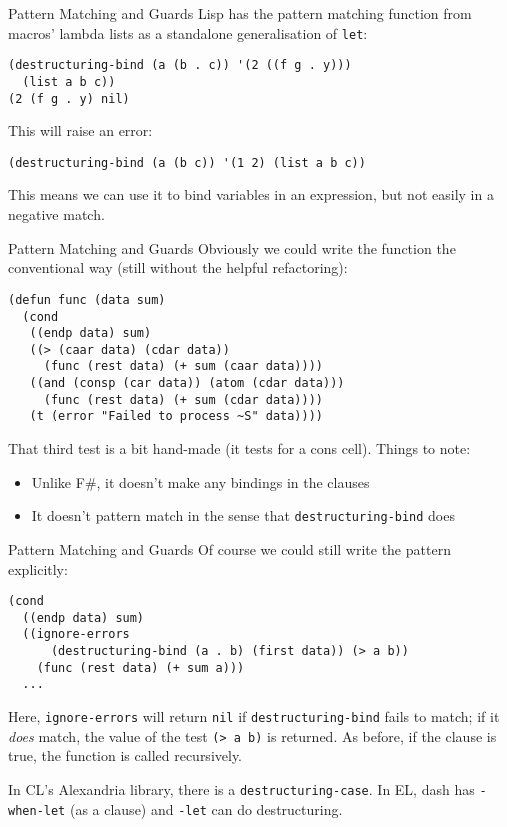 \documentclass[presentation]{beamer}
\begin{document}
\begin{frame}[fragile]{Pattern Matching and Guards}
Lisp has the pattern matching function from macros' lambda lists as a standalone generalisation of \texttt{let}:
\begin{verbatim}
(destructuring-bind (a (b . c)) '(2 ((f g . y)))
  (list a b c))
(2 (f g . y) nil)
\end{verbatim}
This will raise an error:
\begin{verbatim}
(destructuring-bind (a (b c)) '(1 2) (list a b c))
\end{verbatim}
This means we can use it to bind variables in an expression, but not easily in a negative match.

\end{frame}

\begin{frame}[fragile]{Pattern Matching and Guards}
  Obviously we could write the function the conventional way (still without the helpful refactoring):
\begin{verbatim}
(defun func (data sum)
  (cond
   ((endp data) sum)
   ((> (caar data) (cdar data))
     (func (rest data) (+ sum (caar data))))
   ((and (consp (car data)) (atom (cdar data)))
     (func (rest data) (+ sum (cdar data))))
   (t (error "Failed to process ~S" data))))
\end{verbatim}
That third test is a bit hand-made (it tests for a cons cell).  Things to note:
\begin{itemize}
\item Unlike F\#, it doesn't make any bindings in the clauses
\item It doesn't pattern match in the sense that \texttt{destructuring-bind} does
\end{itemize}
\end{frame}

\begin{frame}[fragile]{Pattern Matching and Guards}
  Of course we could still write the pattern explicitly:
\begin{verbatim}
(cond
  ((endp data) sum)
  ((ignore-errors
      (destructuring-bind (a . b) (first data)) (> a b))
    (func (rest data) (+ sum a)))
  ...
\end{verbatim}
Here, \texttt{ignore-errors} will return \texttt{nil} if \texttt{destructuring-bind} fails to match; if it \emph{does} match, the value of the test \texttt{(> a b)} is returned.  As before, if the clause is true, the function is called recursively.

\medskip
In CL's Alexandria library, there is a \texttt{destructuring-case}.  In EL, dash has \texttt{-when-let} (as a clause) and \texttt{-let} can do destructuring.
\end{frame}
\end{document}
